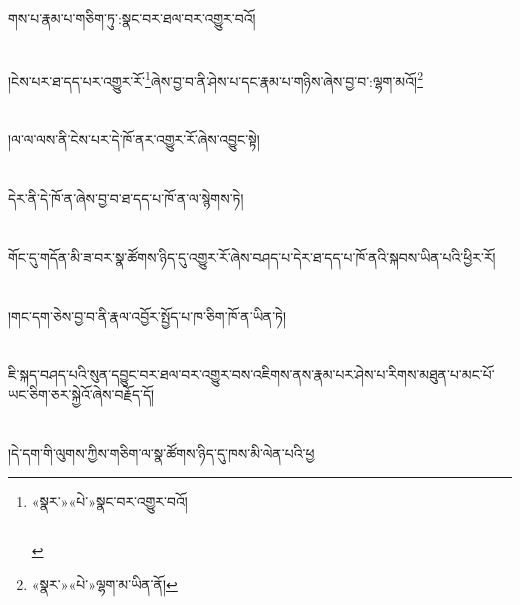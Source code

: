 གས་པ་རྣམ་པ་གཅིག་ཏུ་:སྣང་བར་ཐལ་བར་འགྱུར་བའོ།\chapter{ }།ངེས་པར་ཐ་དད་པར་འགྱུར་རོ་\footnote{«སྣར་»«པེ་»སྣང་བར་འགྱུར་བའོ།\chapter{ }}ཞེས་བྱ་བ་ནི་ཤེས་པ་དང་རྣམ་པ་གཉིས་ཞེས་བྱ་བ་:ལྷག་མའོ།\footnote{«སྣར་»«པེ་»ལྷག་མ་ཡིན་ནོ།}\chapter{ }།ལ་ལ་ལས་ནི་ངེས་པར་དེ་ཁོ་ནར་འགྱུར་རོ་ཞེས་འབྱུང་སྟེ།\chapter{ }དེར་ནི་དེ་ཁོ་ན་ཞེས་བྱ་བ་ཐ་དད་པ་ཁོ་ན་ལ་སྙེགས་ཏེ།\chapter{ }གོང་དུ་གདོན་མི་ཟ་བར་སྣ་ཚོགས་ཉིད་དུ་འགྱུར་རོ་ཞེས་བཤད་པ་དེར་ཐ་དད་པ་ཁོ་ནའི་སྐབས་ཡིན་པའི་ཕྱིར་རོ།\chapter{ }།གང་དག་ཅེས་བྱ་བ་ནི་རྣལ་འབྱོར་སྤྱོད་པ་ཁ་ཅིག་ཁོ་ན་ཡིན་ཏེ།\chapter{ }ཇི་སྐད་བཤད་པའི་སུན་དབྱུང་བར་ཐལ་བར་འགྱུར་བས་འཇིགས་ནས་རྣམ་པར་ཤེས་པ་རིགས་མཐུན་པ་མང་པོ་ཡང་ཅིག་ཅར་སྐྱེའོ་ཞེས་བརྗོད་དོ།\chapter{ }།དེ་དག་གི་ལུགས་ཀྱིས་གཅིག་ལ་སྣ་ཚོགས་ཉིད་དུ་ཁས་མི་ལེན་པའི་ཕྱ